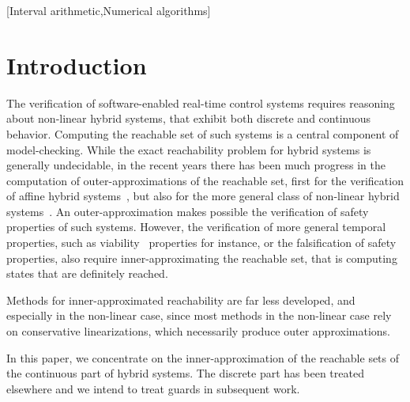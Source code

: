 \documentclass{sig-alternate-05-2015} %
\begin{document}
[Interval arithmetic,Numerical algorithms]\\



\section{Introduction}
%
The verification of software-enabled real-time control systems requires reasoning about non-linear hybrid systems, 
that exhibit both discrete and continuous behavior. Computing the reachable set of such systems is a central component 
of model-checking. While the exact reachability problem for hybrid systems is generally undecidable, in the recent 
years there has been much progress in the computation of outer-approximations of the reachable set, first for the 
verification of affine hybrid systems~\cite{}, but also for the more general class of non-linear hybrid systems~\cite{}. 
An outer-approximation makes possible the verification of safety properties of such systems. However, the verification 
of more general temporal properties, such as viability~\cite{} properties for instance, or the falsification of safety properties, 
also require inner-approximating the reachable set, that is computing states that are definitely reached.
     
Methods for inner-approximated reachability are far less developed, and especially in the non-linear case, 
since most methods in the non-linear case rely on conservative linearizations, which necessarily produce outer approximations.

In this paper, we concentrate on the inner-approximation of the reachable sets of
the continuous part of hybrid systems. The discrete part has been treated elsewhere \cite{hscc14}
and we intend to treat guards in subsequent work. 
\end{document}
